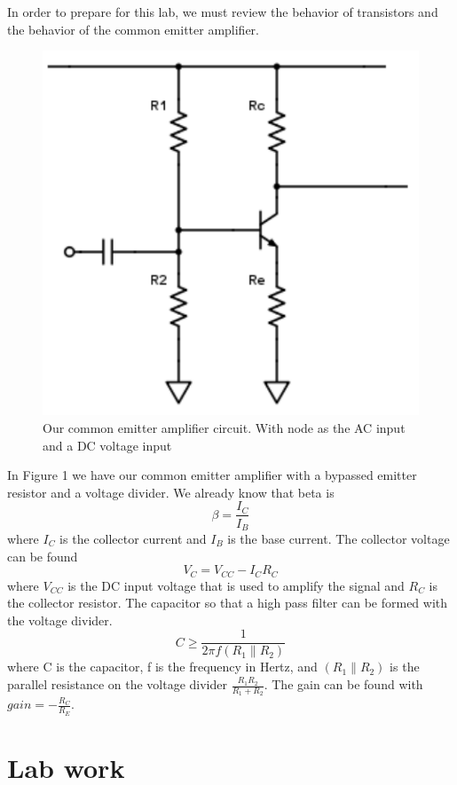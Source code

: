 \documentclass[11pt,letterpaper,onecolumn]{article}
\begin{document}
In order to prepare for this lab, we must review the behavior of transistors and the behavior of the common emitter amplifier.

\begin{figure}[H]
    \centering
    \includegraphics{circuit.pdf}
    \caption{Our common emitter amplifier circuit. With node as the AC input and a DC voltage input}
    \label{fig:my_label}
\end{figure} 
In Figure 1 we have our common emitter amplifier with a bypassed emitter resistor and a voltage divider. We already know that beta is 
$$\beta=\frac{I_C}{I_B}$$
where $I_C$ is the collector current and $I_B$ is the base current. The collector voltage can be found
$$V_{C}=V_{CC}-I_CR_C$$
where $V_{CC}$ is the DC input voltage that is used to amplify the signal and $R_C$ is the collector resistor. The capacitor so that a high pass filter can be formed with the voltage divider. 
$$C\ge\frac{1}{2\pi f(R_1\parallel R_2)}$$
where C is the capacitor, f is the frequency in Hertz, and $(R_1\parallel R_2)$ is the parallel resistance on the voltage divider $\frac{R_1 R_2}{R_1+R_2}$. The gain can be found with $gain = -\frac{R_C}{R_E}$.


\section{Lab work}
\end{document}
